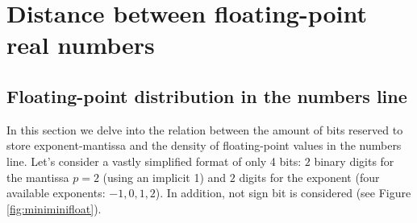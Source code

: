 %            
%            








    \newpage 
    \FloatBarrier
    \section{Distance between floating-point real numbers} \label{sec:roundoff}


        \subsection{Floating-point distribution in the numbers line}

In this section we delve into the relation between the amount of bits reserved to store exponent-mantissa and 
the density of floating-point values in the numbers line. 
Let's consider a vastly simplified format of only 4 bits: $2$ binary digits for the mantissa $p = 2$ (using an implicit 1) and 
$2$ digits for the exponent (four available exponents: $-1, 0, 1, 2$). In addition, not sign bit is considered (see Figure \ref{fig:miniminifloat}).


